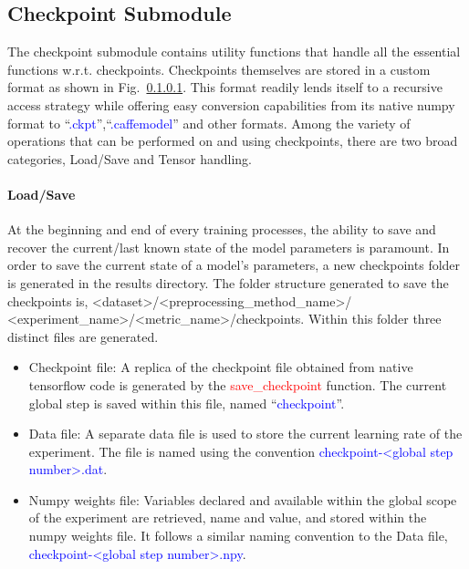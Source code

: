 \documentclass{llncs}
\begin{document}
\subsection{Checkpoint Submodule}
\label{sec:checkpoint}
The checkpoint submodule contains utility functions that handle all the essential functions w.r.t. checkpoints. 
Checkpoints themselves are stored in a custom format as shown in Fig.~\ref{}. 
This format readily lends itself to a recursive access strategy while offering easy conversion capabilities from its native numpy format to ``\textcolor{blue}{.ckpt}'',``\textcolor{blue}{.caffemodel}'' and other formats.
Among the variety of operations that can be performed on and using checkpoints, there are two broad categories, Load/Save and Tensor handling.

\paragraph{Load/Save} 
At the beginning and end of every training processes, the ability to save and recover the current/last known state of the model parameters is paramount.
In order to save the current state of a model's parameters, a new checkpoints folder is generated in the results directory.
The folder structure generated to save the checkpoints is, \textless dataset\textgreater/\textless preprocessing\_method\_name\textgreater/\\\textless experiment\_name\textgreater/\textless metric\_name\textgreater/checkpoints. 
Within this folder three distinct files are generated.
\begin{itemize}
\item Checkpoint file: A replica of the checkpoint file obtained from native tensorflow code is generated by the \textcolor{red}{save\_checkpoint} function. 
The current global step is saved within this file, named ``\textcolor{blue}{checkpoint}''.
\item Data file: A separate data file is used to store the current learning rate of the experiment.
The file is named using the convention \textcolor{blue}{checkpoint-\textless global step number\textgreater .dat}. 
\item Numpy weights file: Variables declared and available within the global scope of the experiment are retrieved, name and value, and stored within the numpy weights file. 
It follows a similar naming convention to the Data file, \textcolor{blue}{checkpoint-\textless global step number\textgreater .npy}.
\end{itemize}
\end{document}
